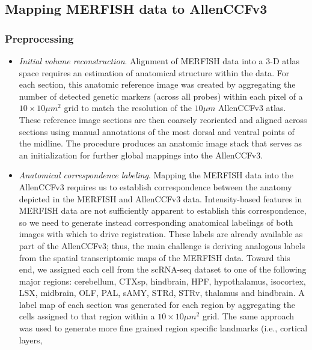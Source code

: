 \documentclass[
  12pt,
]{article}
\begin{document}
\hypertarget{mapping-merfish-data-to-allenccfv3}{%
\subsection{Mapping MERFISH data to
AllenCCFv3}\label{mapping-merfish-data-to-allenccfv3}}

\hypertarget{preprocessing-1}{%
\subsubsection{Preprocessing}\label{preprocessing-1}}

\begin{itemize}
\item
  \emph{Initial volume reconstruction}. Alignment of MERFISH data into a
  3-D atlas space requires an estimation of anatomical structure within
  the data. For each section, this anatomic reference image was created
  by aggregating the number of detected genetic markers (across all
  probes) within each pixel of a \(10 \times 10 \mu m^2\) grid to match
  the resolution of the \(10 \mu m\) AllenCCFv3 atlas. These reference
  image sections are then coarsely reoriented and aligned across
  sections using manual annotations of the most dorsal and ventral
  points of the midline. The procedure produces an anatomic image stack
  that serves as an initialization for further global mappings into the
  AllenCCFv3.
\item
  \emph{Anatomical correspondence labeling}. Mapping the MERFISH data
  into the AllenCCFv3 requires us to establish correspondence between
  the anatomy depicted in the MERFISH and AllenCCFv3 data.
  Intensity-based features in MERFISH data are not sufficiently apparent
  to establish this correspondence, so we need to generate instead
  corresponding anatomical labelings of both images with which to drive
  registration. These labels are already available as part of the
  AllenCCFv3; thus, the main challenge is deriving analogous labels from
  the spatial transcriptomic maps of the MERFISH data. Toward this end,
  we assigned each cell from the scRNA-seq dataset to one of the
  following major regions: cerebellum, CTXsp, hindbrain, HPF,
  hypothalamus, isocortex, LSX, midbrain, OLF, PAL, sAMY, STRd, STRv,
  thalamus and hindbrain. A label map of each section was generated for
  each region by aggregating the cells assigned to that region within a
  \(10 \times 10 \mu m^2\) grid. The same approach was used to generate
  more fine grained region specific landmarks (i.e., cortical layers,

\end{itemize}
\end{document}
